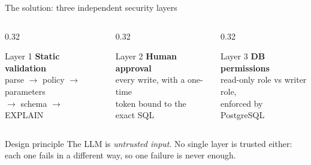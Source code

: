 \documentclass[aspectratio=169,10pt]{beamer}
\begin{document}
\begin{frame}{The solution: three independent security layers}
  \begin{columns}[T]
    \begin{column}{0.32\textwidth}
      \begin{block}{\centering Layer 1}
        \centering\textbf{Static validation}\\[2pt]
        \footnotesize parse $\rightarrow$ policy $\rightarrow$ parameters\\
        $\rightarrow$ schema $\rightarrow$ EXPLAIN
      \end{block}
    \end{column}
    \begin{column}{0.32\textwidth}
      \begin{block}{\centering Layer 2}
        \centering\textbf{Human approval}\\[2pt]
        \footnotesize every write, with a one-time\\
        token bound to the exact SQL
      \end{block}
    \end{column}
    \begin{column}{0.32\textwidth}
      \begin{block}{\centering Layer 3}
        \centering\textbf{DB permissions}\\[2pt]
        \footnotesize read-only role vs writer role,\\
        enforced by PostgreSQL
      \end{block}
    \end{column}
  \end{columns}

  \vspace{8pt}
  \begin{alertblock}{Design principle}
    The LLM is \emph{untrusted input}. No single layer is trusted either:
    each one fails in a different way, so one failure is never enough.
  \end{alertblock}
\end{frame}
\end{document}
